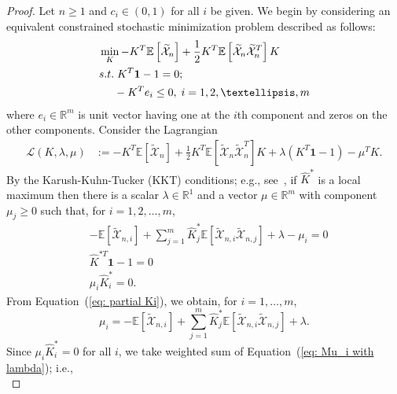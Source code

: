 \documentclass[10pt]{article} %
\begin{document}
	\begin{proof} 
		Let $n \geq 1$ and $c_i \in (0,1)$ for all $i$ be given.
		We begin by considering an equivalent constrained stochastic minimization problem described as follows:
		\begin{align*}
			&\min_{K} -K^T \mathbb{E}\left[ \widetilde{\mathcal{X}}_n \right] 
			+ \frac{1}{2}K^T\mathbb{E}\left[ \widetilde{\mathcal{X}}_n \widetilde{\mathcal{X}}_n^T \right] K\\
			&{\rm s. t.} \; K^T \mathbf{1} - 1 = 0;\\
			&\;\;\;\;\; -K^T e_i \leq 0, \; i=1,2, \ldots,m
		\end{align*}
		where $e_i \in \mathbb{R}^m$ is unit vector having one at the $i$th component and zeros on the other components. 
		Consider the Lagrangian 
		\begin{align*}
			\mathcal{L}(K, \lambda, \mu) &:= -K^T \mathbb{E}\left[ \widetilde{\mathcal{X}}_n \right]
			+ \frac{1}{2}K^T\mathbb{E}\left[ \widetilde{\mathcal{X}}_n \widetilde{\mathcal{X}}_n^T  \right]K +\lambda(K^T \mathbf{1}-1) 
			- \mu^{T}K.
		\end{align*}
		By the Karush-Kuhn-Tucker (KKT) conditions; e.g., see~\cite[Chapter~5]{boyd2004convex}, if $\widehat{K}^{*}$ is a local maximum then there is a scalar $\lambda \in \mathbb{R}^1$ and a vector $\mu \in \mathbb{R}^m$ with component~$\mu_j \geq 0$ such that, for $i=1,2, \ldots,m$,
		\begin{align}
			&-\mathbb{E}\left[\widetilde{\mathcal{X}}_{n,i} \right] + \sum_{j=1}^m \widehat{K}_j^* \mathbb{E}\left[ \widetilde{\mathcal{X}}_{n,i} \widetilde{\mathcal{X}}_{n,j} \right] + \lambda - \mu_i = 0  \label{eq: partial Ki} \\
			& \widehat{K}^{*T} \mathbf{1} - 1 = 0  \label{eq: partial lambda} \\
			& \mu_i \widehat{K}_i^* = 0 .    
			\label{eq: Mu_i x Ki* = 0} 
		\end{align}
		From Equation~(\ref{eq: partial Ki}), we obtain, for $i=1, \ldots,m$,
		\begin{equation} \label{eq: Mu_i with lambda}
			\mu_i = -\mathbb{E}\left[ \widetilde{\mathcal{X}}_{n,i} \right] + \sum_{j=1}^m \widehat{K}_j^* \mathbb{E}\left[ \widetilde{\mathcal{X}}_{n,i} \widetilde{\mathcal{X}}_{n,j} \right] + \lambda . 
		\end{equation}
		Since $\mu_i \widehat{K}_i^* = 0$ for all $i$, we take weighted sum of Equation~(\ref{eq: Mu_i with lambda}); i.e.,
		\begin{equation} \label{eq: weighted sum of mu_i Ki}

\end{equation}
\end{proof}
\end{document}

